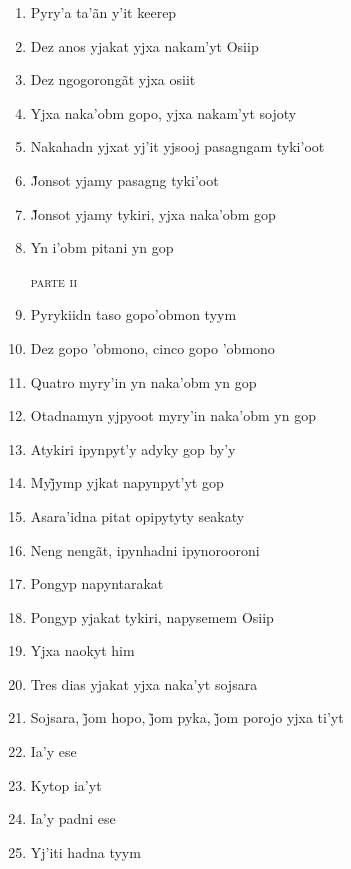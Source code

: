 \begin{enumerate}
 \item Pyry'a ta'ãn y'it keerep
 \item Dez anos yjakat yjxa nakam'yt Osiip
 \item Dez ngogorongãt yjxa osiit
 \item Yjxa naka'obm gopo, yjxa nakam'yt sojoty
 
 \begin{center}\end{center}
 
 \item Nakahadn yjxat yj'it yjsooj pasagngam tyki'oot
 \item J̃onsot yjamy pasagng tyki’oot
 \item J̃onsot yjamy tykiri, yjxa naka’obm gop
 \item Yn i’obm pitani yn gop
 
 \begin{flushright}\textsc{parte ii}\end{flushright}
 
 \item Pyrykiidn taso gopo'obmon tyym
 \item Dez gopo 'obmono, cinco gopo 'obmono
 \item Quatro myry'in yn naka'obm yn gop
 \item Otadnamyn yjpyoot myry'in naka'obm yn gop
 
 \begin{center}\end{center}
 
 \item Atykiri ipynpyt'y adyky gop by'y
 \item Myj̃ymp yjkat napynpyt’yt gop
 \item Asara'idna pitat opipytyty seakaty
 \item Neng nengãt, ipynhadni ipynorooroni
 \item Pongyp napyntarakat
 \item Pongyp yjakat tykiri, napysemem Osiip
 \item Yjxa naokyt him
 
 \begin{center}\end{center}
 
 \item Tres dias yjakat yjxa naka'yt sojsara
 \item Sojsara, j̃om hopo, j̃om pyka, j̃om porojo yjxa ti’yt
 \item Ia'y ese
 \item Kytop ia'yt
 \item Ia'y padni ese
 \item Yj'iti hadna tyym
 

\end{enumerate}
